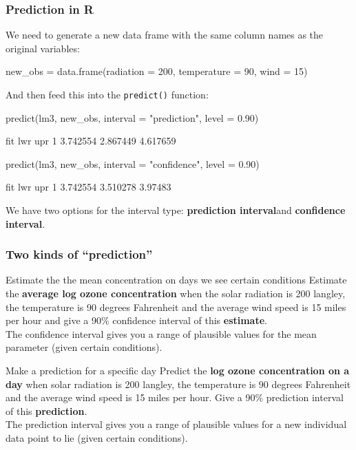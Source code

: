 \documentclass[a4paper]{article}\usepackage[]{graphicx}\usepackage[]{xcolor}
\begin{document}
\subsubsection{Prediction in R}
We need to generate a new data frame with the same column names as the original variables:
\begin{Schunk}
\begin{Sinput}
new_obs = data.frame(radiation = 200, temperature = 90, wind = 15)
\end{Sinput}
\end{Schunk}
And then feed this into the \lstinline|predict()| function:
\begin{Schunk}
\begin{Sinput}
predict(lm3, new_obs, interval = "prediction", level = 0.90)
\end{Sinput}
\begin{Soutput}
       fit      lwr      upr
1 3.742554 2.867449 4.617659
\end{Soutput}
\begin{Sinput}
predict(lm3, new_obs, interval = "confidence", level = 0.90)
\end{Sinput}
\begin{Soutput}
       fit      lwr     upr
1 3.742554 3.510278 3.97483
\end{Soutput}
\end{Schunk}
We have two options for the interval type: \textbf{prediction interval}and \textbf{confidence interval}.
\subsubsection{Two kinds of ``prediction''}
\begin{redbox}{Estimate the the mean concentration on days we see certain conditions}
	Estimate the \textbf{average log ozone concentration} when the solar radiation is 200 langley, the temperature is 90 degrees Fahrenheit and the average wind speed is 15 miles per hour and give a 90\% confidence interval of this \textbf{estimate}.\\
	The confidence interval gives you a range of plausible values for the mean parameter (given certain conditions).
\end{redbox}
\begin{redbox}{Make a prediction for a specific day}
	Predict the \textbf{log ozone concentration on a day\textbf{}} when solar radiation is 200 langley, the temperature is 90 degrees Fahrenheit and the average wind speed is 15 miles per hour. Give a 90\% prediction interval of this \textbf{prediction}.\\
	The prediction interval gives you a range of plausible values for a new individual data point to lie (given certain conditions).
\end{redbox}
\end{document}
